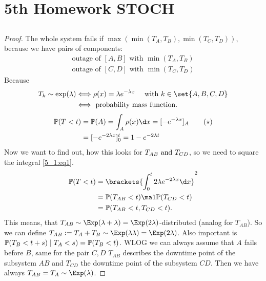 
\section{5th Homework STOCH}
\subsection{}
\begin{proof} %
	The whole system fails if $\max(\min(T_A , T_B), \min(T_C, T_D))$, because we have pairs of components:
	\begin{align*}
		\text{outage of } [A,B] \text{ with } \min(T_A, T_B)\\
		\text{outage of } [C,D] \text{ with } \min(T_C, T_D)
	\end{align*}
	Because
	\begin{align*}
		T_k \sim \exp(\lambda) &\Longleftrightarrow \rho(x) = \lambda e^{-\lambda x} \quad \with k \in \set{A,B,C,D}\\
		&\Longleftrightarrow \text{ probability mass function}.
	\end{align*}
	\begin{align*} %
		\meas(T< t) &= \meas(A) = \int_A \rho(x) \d x = [-e^{-\lambda x}]_A \label{5_1:eq1}\tag{$\star$}\\
		&= [-e^{-2\lambda x}]_0^t = 1 - e^{-2\lambda t}
	\end{align*}
	Now we want to find out, how this looks for $T_{AB} \text{ and } T_{CD}$, so we need to square the integral \eqref{5_1:eq1}.
	\begin{align*}
		\meas(T<t) &= \brackets{\int_0^t 2 \lambda e^{-2 \lambda x} \d x}^2
		\\
		&= \meas(T_{AB} < t) \mal \meas(T_{CD}<t)\\
		&= \meas(T_{AB} < t, T_{CD} < t).
	\end{align*} 
	This means, that $T_{AB} \sim \Exp(\lambda + \lambda) = \Exp(2\lambda)$-distributed (analog for $T_{AB}$). So we can define $T_{AB} := T_A + T_B \sim \Exp(\lambda \lambda) = \Exp(2\lambda)$. Also important is $\mathbb{P}(T_B < t+s) \mid T_A < s) = \mathbb{P}(T_B <t)$.
	WLOG we can always assume that $A$ fails before $B$, same for the pair $C,D$ $T_{AB}$ describes the downtime point of the subsystem $AB$ and $T_{CD}$ the downtime point of the subsystem $CD$. Then we have always $T_{AB} = T_A \sim \Exp(\lambda)$.
\end{proof}

